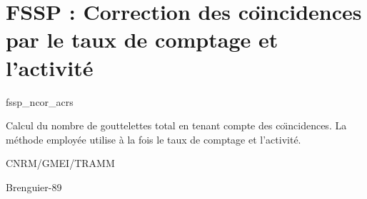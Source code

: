 %
\section{FSSP : Correction des co\"{\i}ncidences par le
taux de comptage et l'activit\'e }

 {\sf fssp\_ncor\_acrs}

Calcul du nombre de gouttelettes total en tenant
compte des co\"{\i}ncidences. La m\'ethode employ\'ee
utilise \`a la fois le taux de comptage et l'activit\'e. 

\bigskip





CNRM/GMEI/TRAMM

Brenguier-89 \cite{Brenguier-89}
